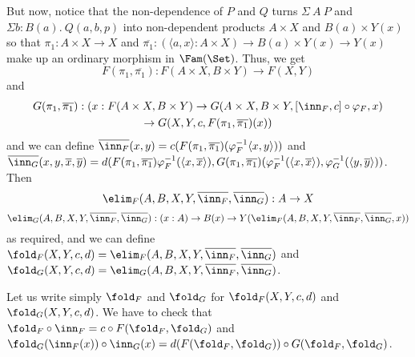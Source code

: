 \documentclass{article}
\begin{document}
But now, notice that the non-dependence of $P$ and $Q$ turns $\Sigma\
A\ P$ and $\Sigma b\!:\!B(a).\ Q(a, b, p)$ into non-dependent products
$A \times X$ and $B(a) \times Y(x)$ so that $\pi_1 : A \times X \to X$
and $\overline{\pi_1} : (\langle a, x\rangle : A \times X) \to B(a)
\times Y(x) \to Y(x)$ make up an ordinary morphism in
$\Fam(\Set)$. Thus, we get 
\[
F(\pi_1, \overline{\pi_1}) : F(A \times X, B \times Y) \to F(X , Y)
\]
 and 
\begin{multline*}
G(\pi_1, \overline{\pi_1}) : (x : F(A \times X, B \times Y) \to G(A \times X, B \times Y, [\inn_F, c] \circ \varphi_F, x) \\
\to G(X, Y, c, F(\pi_1, \overline{\pi_1})(x))
\end{multline*}
and we can define $\overline{\inn_F}(x, y) = c(F(\pi_1,
\overline{\pi_1})(\varphi_F^{-1}\langle x , y\rangle))$ and
$\overline{\inn_G}(x, y, \overline{x}, \overline{y}) = d(F(\pi_1,
\overline{\pi_1})\varphi_F^{-1}(\langle x , \overline{x}\rangle) ,
G(\pi_1, \overline{\pi_1})(\varphi_F^{-1}(\langle x ,
\overline{x}\rangle), \varphi_G^{-1}(\langle y ,
\overline{y}\rangle))$. Then 
\[
\elim_F(A, B, X, Y, \overline{\inn_F},
\overline{\inn_G}) : A \to X
\]
\[\elim_G(A, B, X, Y,
\overline{\inn_F}, \overline{\inn_G}) : (x : A) \to B(x) \to
Y(\elim_F(A, B, X, Y, \overline{\inn_F},
\overline{\inn_G}, x))
\]
as required, and we can define $\fold_F(X, Y, c, d) = \elim_F(A, B, X,
Y, \overline{\inn_F}, \overline{\inn_G})$ and $\fold_G(X, Y, c, d) =
\elim_G(A, B, X, Y, \overline{\inn_F}, \overline{\inn_G})$.

Let us write simply $\fold_F$ and $\fold_G$ for $\fold_F(X, Y, c, d)$
and $\fold_G(X, Y, c, d)$. We have to check that $\fold_F \circ \inn_F
= c \circ F(\fold_F, \fold_G)$ and $\fold_G(\inn_F(x)) \circ \inn_G(x)
= d(F(\fold_F, \fold_G)) \circ G(\fold_F, \fold_G)$.
\end{document}

